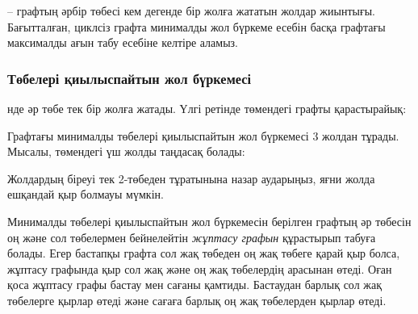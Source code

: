  -- графтың әрбір төбесі кем дегенде 
бір жолға жататын жолдар жиынтығы. Бағытталған,
циклсіз графта минималды жол бүркеме есебін 
басқа графтағы максималды ағын табу есебіне келтіре 
аламыз.

\subsubsection{Төбелері қиылыспайтын жол бүркемесі}

нде 
әр төбе тек бір жолға жатады.
Үлгі ретінде төмендегі графты қарастырайық:
\begin{center}
\end{center}

Графтағы минималды төбелері қиылыспайтын 
жол бүркемесі 3 жолдан тұрады.
Мысалы, төмендегі үш жолды таңдасақ болады:

\begin{center}
\end{center}

Жолдардың біреуі тек 2-төбеден тұратынына назар
аударыңыз, яғни жолда ешқандай қыр болмауы мүмкін.  

Минималды төбелері қиылыспайтын 
жол бүркемесін
берілген графтың әр төбесін оң және сол 
төбелермен бейнелейтін
\emph{жұптасу графын} құрастырып 
табуға болады. Егер бастапқы графта сол жақ төбеден оң жақ төбеге қарай қыр болса, жұптасу графында қыр сол жақ және оң жақ төбелердің арасынан өтеді. Оған қоса жұптасу графы бастау мен сағаны қамтиды.
Бастаудан барлық сол жақ төбелерге қырлар өтеді
және сағаға барлық оң жақ төбелерден қырлар өтеді. 


